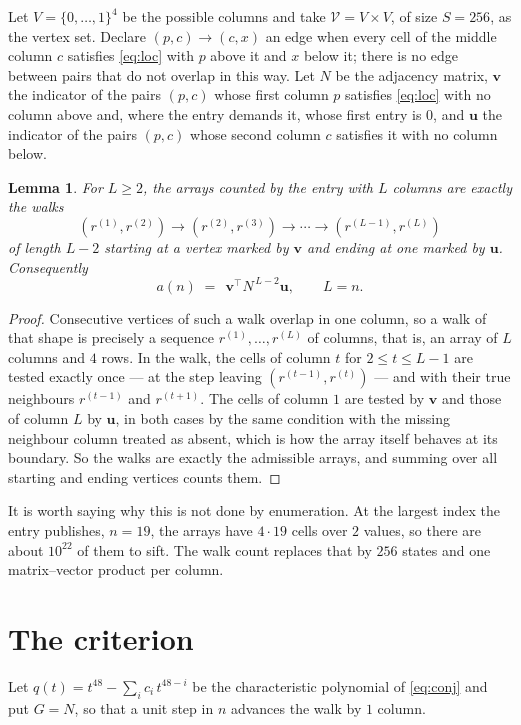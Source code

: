 \documentclass[11pt,a4paper]{article}
\theoremstyle{plain}
\newtheorem{lemma}[theorem]{Lemma}
\theoremstyle{definition}
\begin{document}
Let $V=\{0,\dots,1\}^{4}$ be the possible columns and take
$\mathcal V=V\times V$, of size $S=256$, as the vertex set. Declare $(p,c)\to(c,x)$ an edge
when every cell of the middle column $c$ satisfies \eqref{eq:loc} with $p$ above it and $x$
below it; there is no edge between pairs that do not overlap in this way. Let $N$ be the
adjacency matrix, $\mathbf{v}$ the indicator of the pairs $(p,c)$ whose first column $p$
satisfies \eqref{eq:loc} with no column above and, where the entry demands it, whose first entry is $0$, and $\mathbf{u}$ the indicator of
the pairs $(p,c)$ whose second column $c$ satisfies it with no column below.

\begin{lemma}\label{lem:walk}
For $L\ge2$, the arrays counted by the entry with $L$ columns are exactly the walks
\[
(r^{(1)},r^{(2)})\to(r^{(2)},r^{(3)})\to\cdots\to(r^{(L-1)},r^{(L)})
\]
of length $L-2$ starting at a vertex marked by $\mathbf{v}$ and ending at one marked by
$\mathbf{u}$. Consequently
\[
a(n)\;=\;\,\mathbf{v}^{\!\top}N^{\,L-2}\mathbf{u},\qquad L=n .
\]
\end{lemma}

\begin{proof}
Consecutive vertices of such a walk overlap in one column, so a walk of that shape is
precisely a sequence $r^{(1)},\dots,r^{(L)}$ of columns, that is, an array of $L$ columns
and $4$ rows. In the walk, the cells of column $t$ for $2\le t\le L-1$ are tested
exactly once --- at the step leaving $(r^{(t-1)},r^{(t)})$ --- and with their true
neighbours $r^{(t-1)}$ and $r^{(t+1)}$. The cells of column $1$ are tested by
$\mathbf{v}$ and those of column $L$ by $\mathbf{u}$, in both cases by the same condition
with the missing neighbour column treated as absent, which is how the array itself behaves at
its boundary. So the walks are exactly the admissible arrays, and summing over all starting
and ending vertices counts them.
\end{proof}


It is worth saying why this is not done by enumeration. At the largest index the entry
publishes, $n=19$, the arrays have $4\cdot19$ cells over
$2$ values, so there are about $10^{22}$ of them to sift. The
walk count replaces that by $256$ states and one matrix--vector product per column.
\section{The criterion}

Let $q(t)=t^{48}-\sum_i c_i\,t^{48-i}$ be the characteristic polynomial of
\eqref{eq:conj} and put $G=N$, so that a unit step in $n$ advances the walk by
$1$ column.
\end{document}
